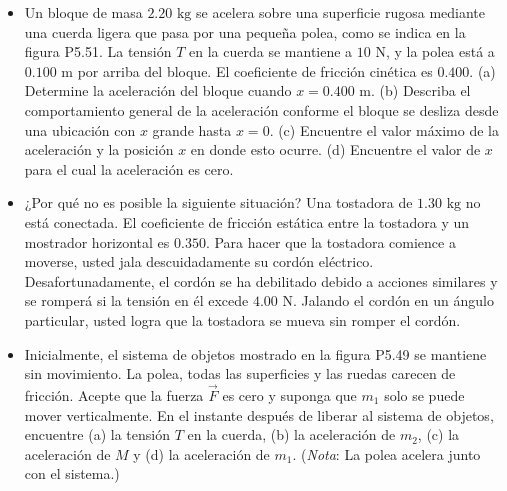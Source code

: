 \documentclass[11pt,a4paper]{article}
\begin{document}
\begin{itemize}
    \item[\textbf{51.}] Un bloque de masa $2.20 \text{ kg}$ se acelera sobre una superficie rugosa mediante una cuerda ligera que pasa por una pequeña polea, como se indica en la figura P5.51. La tensión $T$ en la cuerda se mantiene a $10 \text{ N}$, y la polea está a $0.100 \text{ m}$ por arriba del bloque. El coeficiente de fricción cinética es $0.400$. (a) Determine la aceleración del bloque cuando $x = 0.400 \text{ m}$. (b) Describa el comportamiento general de la aceleración conforme el bloque se desliza desde una ubicación con $x$ grande hasta $x = 0$. (c) Encuentre el valor máximo de la aceleración y la posición $x$ en donde esto ocurre. (d) Encuentre el valor de $x$ para el cual la aceleración es cero.
    \vspace*{8cm}

    \item[\textbf{52.}] ¿Por qué no es posible la siguiente situación? Una tostadora de $1.30 \text{ kg}$ no está conectada. El coeficiente de fricción estática entre la tostadora y un mostrador horizontal es $0.350$. Para hacer que la tostadora comience a moverse, usted jala descuidadamente su cordón eléctrico. Desafortunadamente, el cordón se ha debilitado debido a acciones similares y se romperá si la tensión en él excede $4.00 \text{ N}$. Jalando el cordón en un ángulo particular, usted logra que la tostadora se mueva sin romper el cordón.
    \vspace*{6cm}

    \item[\textbf{53.}] Inicialmente, el sistema de objetos mostrado en la figura P5.49 se mantiene sin movimiento. La polea, todas las superficies y las ruedas carecen de fricción. Acepte que la fuerza $\vec{F}$ es cero y suponga que $m_1$ solo se puede mover verticalmente. En el instante después de liberar al sistema de objetos, encuentre (a) la tensión $T$ en la cuerda, (b) la aceleración de $m_2$, (c) la aceleración de $M$ y (d) la aceleración de $m_1$. (\textit{Nota}: La polea acelera junto con el sistema.)
    \vspace*{8cm}
\end{itemize}

\newpage
\end{document}
